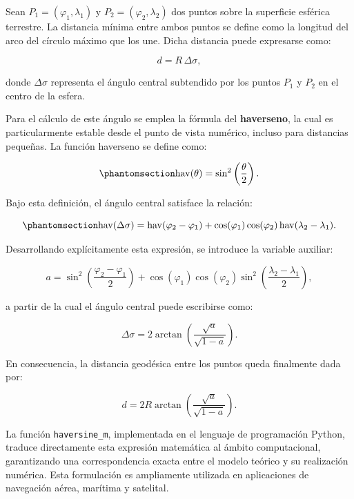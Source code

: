 \documentclass[
  spanish,
  us-letterpaper,
]{scrreprt}
\numberwithin{equation}{section}
\begin{document}
Sean \(P_1 = (\varphi_1, \lambda_1)\) y \(P_2 = (\varphi_2, \lambda_2)\)
dos puntos sobre la superficie esférica terrestre. La distancia mínima
entre ambos puntos se define como la longitud del arco del círculo
máximo que los une. Dicha distancia puede expresarse como:

\[
d = R \, \Delta\sigma,
\]

donde \(\Delta\sigma\) representa el ángulo central subtendido por los
puntos \(P_1\) y \(P_2\) en el centro de la esfera.

Para el cálculo de este ángulo se emplea la fórmula del
\textbf{haverseno}, la cual es particularmente estable desde el punto de
vista numérico, incluso para distancias pequeñas. La función haverseno
se define como:

\begin{equation}\phantomsection\label{eq-haverseno}{
\operatorname{hav}(\theta) = \sin^2\left(\frac{\theta}{2}\right). 
}\end{equation}

Bajo esta definición, el ángulo central satisface la relación:

\begin{equation}\phantomsection\label{eq-angulocentral}{
\operatorname{hav}(\Delta\sigma) = \operatorname{hav}(\varphi_2 - \varphi_1) + \cos(\varphi_1)\cos(\varphi_2)\operatorname{hav}(\lambda_2 - \lambda_1). 
}\end{equation}

Desarrollando explícitamente esta expresión, se introduce la variable
auxiliar:

\[
a = \sin^2\left(\frac{\varphi_2 - \varphi_1}{2}\right) + \cos(\varphi_1)\cos(\varphi_2) \sin^2\left(\frac{\lambda_2 - \lambda_1}{2}\right),
\]

a partir de la cual el ángulo central puede escribirse como:

\[
\Delta\sigma = 2 \arctan\left(\frac{\sqrt{a}}{\sqrt{1-a}}\right).
\]

En consecuencia, la distancia geodésica entre los puntos queda
finalmente dada por:

\[
d = 2R \arctan\left(\frac{\sqrt{a}}{\sqrt{1-a}}\right).
\]

La función \texttt{haversine\_m}, implementada en el lenguaje de
programación Python, traduce directamente esta expresión matemática al
ámbito computacional, garantizando una correspondencia exacta entre el
modelo teórico y su realización numérica. Esta formulación es
ampliamente utilizada en aplicaciones de navegación aérea, marítima y
satelital.
\end{document}
